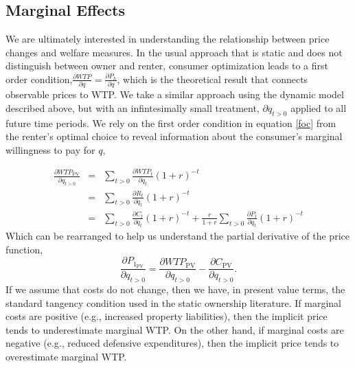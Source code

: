 \documentclass[ecta,nameyear,draft]{econsocart}
\theoremstyle{plain}
\theoremstyle{remark}
\begin{document}
\subsection{Marginal Effects}
We are ultimately interested in understanding the relationship between price changes and welfare measures. In the usual approach that is static and does not distinguish between owner and renter, consumer optimization leads to a first order condition,$\frac{\partial{\mathit{WTP}}}{\partial q}=\frac{\partial P_h}{\partial q}$, which is the theoretical result that connects observable prices to WTP. We take a similar approach using the dynamic model described above, but with an infintesimally small treatment, $\partial q_{t>0}$ applied to all future time periods. We rely on the first order condition in equation \ref{foc} from the renter's optimal choice to reveal information about the consumer's marginal willingness to pay for $q$,

\begin{eqnarray}
\frac{\partial \mathit{WTP}_{\mathrm{PV}}}{\partial q_{t>0}}&=&\sum_{t>0} \frac{\partial \mathit{WTP}_t}{\partial q_t}(1+r)^{-t}\label{pvmwtp}\nonumber\\ 
&=&\sum_{t>0} \frac{\partial R_t}{\partial q_t}(1+r)^{-t}\nonumber\\
&=&\sum_{t>0} \frac{\partial C_t}{\partial q_t}(1+r)^{-t}+\frac{r}{1+r}\sum_{t>0} \frac{\partial P_t}{\partial q_t}(1+r)^{-t}\nonumber
\end{eqnarray}
Which can be rearranged to help us understand the partial derivative of the price function,
\begin{equation}
	\frac{\partial P_{1_{\mathrm{PV}}}} {\partial q_{t>0}}=\frac{\partial \mathit{WTP}_{\mathrm{PV}}}{\partial q_{t>0}}-\frac{\partial C_{\mathrm{PV}}}{\partial q_{t>0}} \label{marginalPrice}.
\end{equation}
If we assume that costs do not change, then we have, in present value terms, the standard tangency condition used in the static ownership literature. If marginal costs are positive (e.g., increased property liabilities), then the implicit price tends to underestimate marginal WTP. On the other hand, if marginal costs are negative (e.g., reduced defensive expenditures), then the implicit price tends to overestimate marginal WTP.
\end{document}

